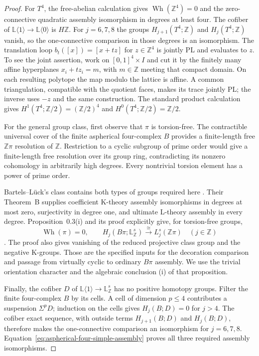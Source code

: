 \begin{proof}
For $T^4$, the free-abelian calculation
\cite[Example~24.16, p.~278]{Ranicki1992TopologicalManifolds}
gives $\operatorname{Wh}(\mathbb Z^4)=0$ and the
zero-connective quadratic assembly isomorphism in
degrees at least four.  The cofiber of
$\mathbb L\langle1\rangle\to\mathbb L\langle0\rangle$
is $H\mathbb Z$.  For $j=6,7,8$ the groups
$H_{j+1}(T^4;\mathbb Z)$ and $H_j(T^4;\mathbb Z)$
vanish, so the one-connective comparison in those
degrees is an isomorphism.  The translation loop
$b_t([x])=[x+tz]$ for $z\in\mathbb Z^4$ is jointly
PL and evaluates to $z$.  To see the joint assertion, work on
$[0,1]^4\times I$ and cut it by the finitely many affine hyperplanes
$x_i+t z_i=m$, with $m\in\mathbb Z$ meeting that compact domain.
On each resulting polytope the map modulo the lattice is affine.
A common triangulation, compatible with the quotient faces, makes
its trace jointly PL; the inverse uses $-z$ and the same construction.
The standard product
calculation gives $H^1(T^4;\mathbb Z/2)=(\mathbb Z/2)^4$
and $H^0(T^4;\mathbb Z/2)=\mathbb Z/2$.

For the general group class, first observe that $\pi$
is torsion-free.  The contractible universal cover
of the finite aspherical four-complex $B$ provides a
finite-length free $\mathbb Z\pi$ resolution of
$\mathbb Z$.  Restriction to a cyclic subgroup of
prime order would give a finite-length free resolution
over its group ring, contradicting its nonzero
cohomology in arbitrarily high degrees.  Every
nontrivial torsion element has a power of prime order.

Bartels--L\"uck's class contains both types of groups
required here
\cite[definition on p.~632]{BartelsLuck2012Borel}.
Their Theorem~B supplies coefficient K-theory
assembly isomorphisms in degrees at most zero,
surjectivity in degree one, and ultimate L-theory
assembly in every degree.  Proposition~0.3(i) and
its proof explicitly give, for torsion-free groups,
\begin{equation}\label{eq:aspherical-four-simple-assembly}
 \operatorname{Wh}(\pi)=0,\qquad
 H_j(B\pi;\mathbb L^s_{\mathbb Z})
       \xrightarrow{\ \cong\ }L_j^s(\mathbb Z\pi)
 \quad(j\in\mathbb Z)
\end{equation}
\cite[Theorem~B, pp.~633--634; Proposition~0.3 and
proof, pp.~634--635]{BartelsLuck2012Borel}.
The proof also gives vanishing of the reduced
projective class group and the negative K-groups.
Those are the specified inputs for the decoration
comparison and passage from virtually cyclic to
ordinary $B\pi$ assembly.  We use the trivial
orientation character and the algebraic conclusion
(i) of that proposition.

Finally, the cofiber $D$ of
$\mathbb L\langle1\rangle\to\mathbb L^s_{\mathbb Z}$
has no positive homotopy groups.  Filter the finite
four-complex $B$ by its cells.  A cell of dimension
$p\leq4$ contributes a suspension $\Sigma^pD$;
induction on the cells gives $H_j(B;D)=0$ for $j>4$.
The cofiber exact sequence, with outside terms
$H_{j+1}(B;D)$ and $H_j(B;D)$, therefore makes the
one-connective comparison an isomorphism for
$j=6,7,8$.  Equation~\eqref{eq:aspherical-four-simple-assembly}
proves all three required assembly isomorphisms.
\end{proof}

